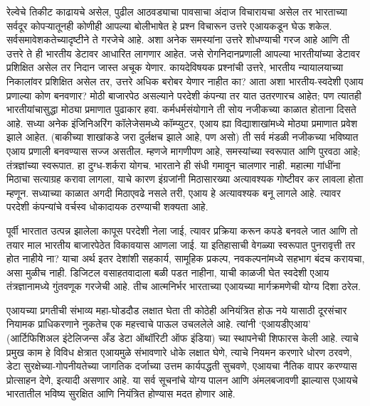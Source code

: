 रेल्वेचे तिकीट काढायचे असेल, पुढील आठवड्याचा पावसाचा अंदाज विचारायचा असेल तर भारताच्या सर्वदूर कोपऱ्यातूनही कोणीही आपल्या बोलीभाषेत हे प्रश्न विचारून उत्तरे एआयकडून घेऊ शकेल. सर्वसमावेशकतेच्यादृष्टीने ते गरजेचे आहे. अशा अनेक समस्यांना उत्तरे शोधण्याची गरज आहे आणि ती उत्तरे ते ही भारतीय डेटावर आधारित लागणार आहेत.  जसे रोगनिदानप्रणाली आपल्या भारतीयांच्या डेटावर प्रशिक्षित असेल तर निदान जास्त अचूक येणार. कायदेविषयक प्रश्नांची उत्तरे, भारतीय न्यायालयाच्या निकालांवर प्रशिक्षित असेल तर, उत्तरे अधिक बरोबर येणार नाहीत का? आता अशा भारतीय-स्वदेशी एआय प्रणाल्या कोण बनवणार? मोठी बाजारपेठ असल्याने परदेशी कंपन्या तर यात उतरणारच आहेत; पण त्यातही भारतीयांचासुद्धा मोठ्या प्रमाणात पुढाकार हवा.  कर्मधर्मसंयोगाने ती सोय नजीकच्या काळात होताना दिसते आहे. सध्या अनेक इंजिनिअरिंग कॉलेजेसमध्ये कॉम्प्युटर, एआय ह्या विद्याशाखांमध्ये मोठ्या प्रमाणात प्रवेश झाले आहेत. (बाकीच्या शाखांकडे जरा दुर्लक्षच झाले आहे, पण असो) ती सर्व मंडळी नजीकच्या भविष्यात एआय प्रणाली बनवण्यास सज्ज असतील. म्हणजे मागणीपण आहे, समस्यांच्या स्वरूपात आणि पुरवठा आहे; तंत्रज्ञांच्या स्वरूपात. हा दुग्ध-शर्करा योगच. भारताने ही संधी गमावून चालणार नाही. महात्मा गांधींना मिठाचा सत्याग्रह करावा लागला, याचे कारण इंग्रजांनी मिठासारख्या अत्यावश्यक गोष्टीवर कर लावला होता म्हणून. सध्याच्या काळात अगदी मिठाएवढे नसले तरी, एआय हे अत्यावश्यक बनू लागले आहे. त्यावर परदेशी कंपन्यांचे वर्चस्व धोकादायक ठरण्याची शक्यता आहे.

पूर्वी भारतात उत्पन्न झालेला कापूस परदेशी नेला जाई, त्यावर प्रक्रिया करून कपडे बनवले जात आणि तो तयार माल भारतीय बाजारपेठेत विकावयास आणला जाई. या इतिहासाची वेगळ्या स्वरूपात पुनरावृत्ती तर होत नाहीये ना? याचा अर्थ इतर देशांशी सहकार्य, सामूहिक प्रकल्प, नवकल्पनांमध्ये सहभाग बंदच करायचा, असा मुळीच नाही. डिजिटल वसाहतवादाला बळी पडत नाहीना, याची काळजी घेत स्वदेशी एआय तंत्रज्ञानामध्ये गुंतवणूक गरजेची आहे. तीच आत्मनिर्भर भारताच्या एआयच्या मार्गक्रमणेची योग्य दिशा ठरेल.

एआयच्या प्रगतीची संभाव्य महा-घोडदौड लक्षात घेता ती कोठेही अनियंत्रित होऊ नये यासाठी दूरसंचार नियामक प्राधिकरणाने नुकतेच एक महत्त्वाचे पाऊल उचललेले आहे. त्यांनी `एआयडीएआय' (आर्टिफिशिअल इंटेलिजन्स अँड डेटा ऑथॉरिटी ऑफ इंडिया) च्या स्थापनेची शिफारस केली आहे. त्याचे प्रमुख काम हे विविध क्षेत्रात एआयमुळे संभावणारे धोके लक्षात घेणे, त्याचे नियमन करणारे धोरण ठरवणे, डेटा सुरक्षेच्या-गोपनीयतेच्या जागतिक दर्जाच्या उत्तम कार्यपद्धती सुचवणे, एआयचा नैतिक वापर करण्यास प्रोत्साहन देणे, इत्यादी असणार आहे. या सर्व सूचनांचे योग्य पालन आणि अंमलबजावणी झाल्यास एआयचे भारतातील भविष्य सुरक्षित आणि नियंत्रित होण्यास मदत होणार आहे.

